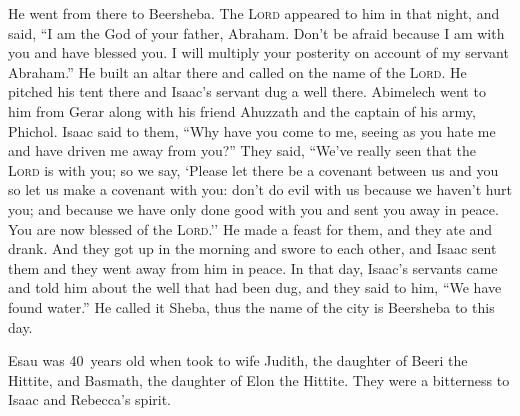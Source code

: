 \begin{inparaenum}
     He went from there to Beersheba.%
     The \textsc{Lord} appeared to him in that night, and said, ``I am the God of your father, Abraham. Don't be afraid because I am with you and have blessed you. I will multiply your posterity on account of my servant Abraham.''%
     He built an altar there and called on the name of the \textsc{Lord}. He pitched his tent there and Isaac's servant dug a well there.%
     Abimelech went to him from Gerar along with his friend Ahuzzath and the captain of his army, Phichol.%
     Isaac said to them, ``Why have you come to me, seeing as you hate me and have driven me away from you?''%
     They said, ``We've really seen that the \textsc{Lord} is with you; so we say, `Please let there be a covenant between us and you so let us make a covenant with you:%
     don't do evil with us because we haven't hurt you; and because we have only done good with you and sent you away in peace. You are now blessed of the \textsc{Lord}.''%
     He made a feast for them, and they ate and drank.%
     And they got up in the morning and swore to each other, and Isaac sent them and they went away from him in peace.%
     In that day, Isaac's servants came and told him about the well that had been dug, and they said to him, ``We have found water.''%
     He called it Sheba, thus the name of the city is Beersheba to this day.%
    
     Esau was 40~years old when took to wife Judith, the daughter of Beeri the Hittite, and Basmath, the daughter of Elon the Hittite.%
     They were a bitterness to Isaac and Rebecca's spirit.%
\end{inparaenum}
